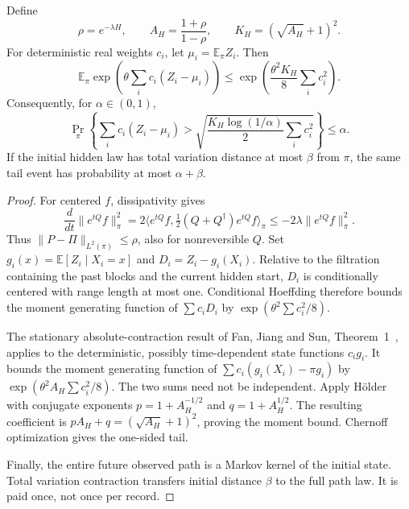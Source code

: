 \begin{theorem}
Define
\begin{equation}
 \rho=e^{-\lambda H},\qquad
 A_H=\frac{1+\rho}{1-\rho},\qquad
 K_H=(\sqrt{A_H}+1)^2.
 \label{eq:ci-dependent-proxy}
\end{equation}
For deterministic real weights $c_i$, let
$\mu_i=\mathbb E_\pi Z_i$. Then
\begin{equation}
 \mathbb E_\pi\exp\!\left(\theta\sum_i c_i(Z_i-\mu_i)\right)
 \leq\exp\!\left(\frac{\theta^2K_H}{8}\sum_i c_i^2\right).
 \label{eq:ci-dependent-mgf}
\end{equation}
Consequently, for $\alpha\in(0,1)$,
\begin{equation}
 \Pr_\pi\!\left\{\sum_i c_i(Z_i-\mu_i)>
 \sqrt{\frac{K_H\log(1/\alpha)}2\sum_i c_i^2}\right\}
 \leq\alpha.
 \label{eq:ci-dependent-tail}
\end{equation}
If the initial hidden law has total variation distance at most $\beta$ from
$\pi$, the same tail event has probability at most $\alpha+\beta$.
\end{theorem}
\begin{proof}
For centered $f$, dissipativity gives
\[
 \frac{d}{dt}\|e^{tQ}f\|_\pi^2
 =2\langle e^{tQ}f,\tfrac12(Q+Q^\dagger)e^{tQ}f\rangle_\pi
 \leq-2\lambda\|e^{tQ}f\|_\pi^2.
\]
Thus $\|P-\Pi\|_{L^2(\pi)}\leq\rho$, also for nonreversible $Q$.
Set $g_i(x)=\mathbb E[Z_i\mid X_i=x]$ and
$D_i=Z_i-g_i(X_i)$. Relative to the filtration containing the past blocks and
the current hidden start, $D_i$ is conditionally centered with range length
at most one. Conditional Hoeffding therefore bounds the moment generating
function of $\sum c_iD_i$ by $\exp(\theta^2\sum c_i^2/8)$.

The stationary absolute-contraction result of Fan, Jiang and Sun,
Theorem~1~\cite{ciFan2021}, applies to the deterministic, possibly
time-dependent state functions $c_i g_i$. It bounds the moment generating
function of $\sum c_i(g_i(X_i)-\pi g_i)$ by
$\exp(\theta^2 A_H\sum c_i^2/8)$. The two sums need not be independent.
Apply H\"older with conjugate exponents
$p=1+A_H^{-1/2}$ and $q=1+A_H^{1/2}$. The resulting coefficient is
$pA_H+q=(\sqrt{A_H}+1)^2$, proving the moment bound. Chernoff optimization
gives the one-sided tail.

Finally, the entire future observed path is a Markov kernel of the initial
state. Total variation contraction transfers initial distance $\beta$ to
the full path law. It is paid once, not once per record.
\end{proof}

